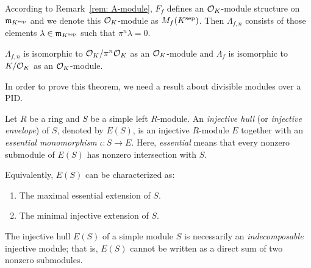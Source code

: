 According to Remark~\ref{rem: A-module}, $F_f$ defines an $\mathcal{O}_K$-module structure on
$\mathfrak{m}_{K^{\mathrm{sep}}}$ and we denote this $\mathcal{O}_K$-module as $M_f(K^{\mathrm{sep}})$.
Then $\Lambda_{f,n}$ consists of those
elements $\lambda \in \mathfrak{m}_{K^{\mathrm{sep}}}$ such that $\pi ^n \lambda = 0$.

\begin{theorem}
    $\Lambda_{f,n}$ is isomorphic to $\mathcal{O}_K/ \pi^n \mathcal{O}_K$ as an $\mathcal{O}_K$-module and
    $\Lambda_f$ is isomorphic to $K / \mathcal{O}_K $ as an $\mathcal{O}_K$-module.
    \label{thm: Lam_iso_K_quot_O}
\end{theorem}

In order to prove this theorem, we need a result about divisible modules over a PID.

\begin{definition}
Let $R$ be a ring and $S$ be a simple left $R$-module. An \emph{injective hull}
(or \emph{injective envelope}) of $S$, denoted by $E(S)$, is an injective $R$-module $E$
together with an \emph{essential monomorphism} $\iota \colon S \to E$. Here, \emph{essential} means
that every nonzero submodule of $E(S)$ has nonzero intersection with $S$.

Equivalently, $E(S)$ can be characterized as:
\begin{enumerate}
    \item The maximal essential extension of $S$.
    \item The minimal injective extension of $S$.
\end{enumerate}
\end{definition}

\begin{remark}
    The injective hull $E(S)$ of a simple module $S$ is necessarily an
    \emph{indecomposable} injective module; that is, $E(S)$ cannot be written as
    a direct sum of two nonzero submodules.
\end{remark}

